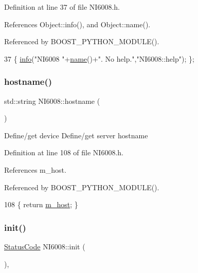 Definition at line 37 of file N\+I6008.\+h.



References Object\+::info(), and Object\+::name().



Referenced by B\+O\+O\+S\+T\+\_\+\+P\+Y\+T\+H\+O\+N\+\_\+\+M\+O\+D\+U\+L\+E().


\begin{DoxyCode}
37 \{ \hyperlink{classObject_a644fd329ea4cb85f54fa6846484b84a8}{info}(\textcolor{stringliteral}{"NI6008 "}+\hyperlink{classObject_a300f4c05dd468c7bb8b3c968868443c1}{name}()+\textcolor{stringliteral}{". No help."},\textcolor{stringliteral}{"NI6008::help"}); \};
\end{DoxyCode}
\mbox{\label{classNI6008_a124e9f3daa92c396b6f66fb1c29a686d}} 
\subsubsection{\texorpdfstring{hostname()}{hostname()}}
{\footnotesize\ttfamily std\+::string N\+I6008\+::hostname (\begin{DoxyParamCaption}{ }\end{DoxyParamCaption})\hspace{0.3cm}{\ttfamily [inline]}}

Define/get device Define/get server hostname 

Definition at line 108 of file N\+I6008.\+h.



References m\+\_\+host.



Referenced by B\+O\+O\+S\+T\+\_\+\+P\+Y\+T\+H\+O\+N\+\_\+\+M\+O\+D\+U\+L\+E().


\begin{DoxyCode}
108 \{ \textcolor{keywordflow}{return} \hyperlink{classNI6008_ab8b247caa89b1dc9b9c78b0c1b08ed5d}{m\_host}; \} 
\end{DoxyCode}
\mbox{\label{classNI6008_ab6a993713c9562e78c634fb30f31b130}} 
\subsubsection{\texorpdfstring{init()}{init()}}
{\footnotesize\ttfamily \hyperlink{classStatusCode}{Status\+Code} N\+I6008\+::init (\begin{DoxyParamCaption}{ }\end{DoxyParamCaption})\hspace{0.3cm}{\ttfamily [inline]}, {\ttfamily [virtual]}}

